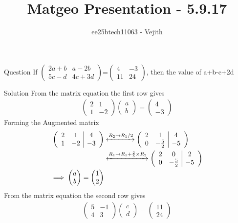 \documentclass{beamer}
\title{Matgeo Presentation - 5.9.17}
\author{ee25btech11063 - Vejith}
\numberwithin{equation}{section}
\theoremstyle{remark}
\newcommand{\myvec}[1]{\ensuremath{\begin{pmatrix}#1\end{pmatrix}}}
\begin{document}
\frame{\titlepage}
\begin{frame}{Question}
If   $\begin{pmatrix}
    2a+b & a-2b\\
    5c-d & 4c+3d
\end{pmatrix}$=$\begin{pmatrix}
    4 & -3\\
    11 & 24
\end{pmatrix}$, then the value of a+b-c+2d
\end{frame}

 \begin{frame}{Solution}
     From the matrix equation the first row gives
\begin{align}
    \begin{pmatrix}
        2 & 1\\
        1 & -2
    \end{pmatrix} \myvec{a\\b}=\myvec{4\\-3}
    \end{align}
    Forming the Augmented matrix
    \begin{align}
       \left(\begin{array}{cc|c}
        2 & 1 & 4\\
        1 & -2 & -3
\end{array}\right) &\xleftrightarrow{R_2 \rightarrow R_1/2}
\left(\begin{array}{cc|c} 
        2 & 1 & 4\\
        0 & -\frac{5}{2} & -5
\end{array}\right) \\
&\xleftrightarrow{R_1 \rightarrow R_1+\frac{2}{5}\times R_2} \left(\begin{array}{cc|c}
        2 & 0 & 2\\
        0 & -\frac{5}{2} & -5
\end{array}\right)\\
\implies \myvec{a\\b}=\myvec{1\\2}
    \end{align}
    From the matrix equation the second row gives
    \begin{align}
    \begin{pmatrix}
        5 & -1\\
        4 & 3
    \end{pmatrix} \myvec{c\\d}=\myvec{11\\24}
    \end{align}
    \end{frame}
\end{document}
